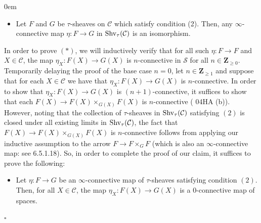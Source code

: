 \documentclass[10pt]{article}
\newcommand{\mS}{\mathcal S}
\newcommand{\C}{\mathcal C}
\newcommand{\ZZ}{\mathbb{Z}}
\def\ZZ{{\mathbf Z}}
\renewcommand{\qed}{\hfill$\square$}
\renewenvironment{proof}{\begin{addmargin}[1em]{0em}\begin{newproof}}{\end{newproof}\end{addmargin}\qed}
\theoremstyle{witharg}
\theoremstyle{witharg}
\theoremstyle{witharg2}
\begin{document}
\begin{proof}
   \begin{itemize}
   
       \item [$(*)$] Let $F$ and $G$ be $\tau$-sheaves on $\C$ which satisfy condition (2). Then, any $\infty$-connective map $\eta:F\rightarrow G$ in $\textnormal{Shv}_\tau(\C)$ is an isomorphism. 
       
   \end{itemize}
   
   
   In order to prove $(*)$, we will inductively verify that for all such $\eta:F\rightarrow F$ and $X\in \C$, the map $\eta_X:F(X)\rightarrow G(X)$ is $n$-connective in $\mS$ for all $n\in \ZZ_{\geq 0}$. Temporarily delaying the proof of the base case $n=0$, let $n\in \ZZ_{\geq 1}$ and suppose that for each $X\in \C$ we have that $\eta_X:F(X)\rightarrow G(X)$ is $n$-connective. In order to show that $\eta_X:F(X)\rightarrow G(X)$ is $(n+1)$-connective, it suffices to show that each $F(X)\rightarrow F(X)\times_{G(X)}F(X)$ is $n$-connective ( 04HA (b)). However, noting that the collection of $\tau$-sheaves in $\textnormal{Shv}_\tau(\C)$ satisfying $(2)$ is closed under all existing limits in $\textnormal{Shv}_\tau(\C)$, the fact that $F(X)\rightarrow F(X)\times_{G(X)}F(X)$ is $n$-connective follows from applying our inductive assumption to the arrow $F\rightarrow F\times_GF$ (which is also an $\infty$-connective map: see  6.5.1.18). So, in order to complete the proof of our claim, it suffices to prove the following:

   \begin{itemize}

       \item [$(*^\prime)$] Let $\eta:F\rightarrow G$ be an $\infty$-connective map of $\tau$-sheaves satisfying condition $(2)$. Then, for all $X\in \C$, the map $\eta_X:F(X)\rightarrow G(X)$ is a $0$-connective map of spaces.

   \end{itemize}


\end{proof}
\end{document}
